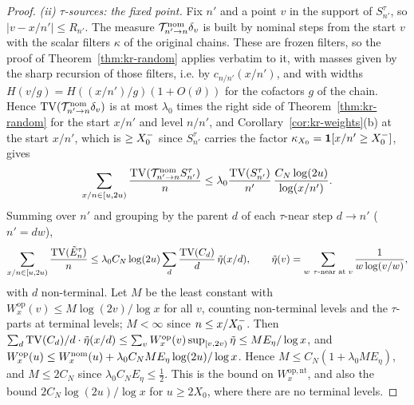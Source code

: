 \begin{proof}
\emph{(ii) $\tau$-sources: the fixed point.} Fix $n'$ and a point $v$ in the support of $S^\tau_{n'}$, so
$|v-x/n'|\le R_{n'}$. The measure $\mathcal T^{\mathrm{nom}}_{n'\to n}\delta_v$ is built by nominal steps from the start $v$ with the
scalar filters $\kappa$ of the original chains. These are frozen filters, so the proof of Theorem~\ref{thm:kr-random}
applies verbatim to it, with masses given by the sharp recursion of those filters, i.e. by $c_{n/n'}(x/n')$, and with widths
$H(v/g)=H((x/n')/g)(1+O(\vartheta))$ for the cofactors $g$ of the chain. Hence $\operatorname{TV}(\mathcal T^{\mathrm{nom}}_{n'\to n}\delta_v)$ is
at most $\lambda_0$ times the right side of Theorem~\ref{thm:kr-random} for the start $x/n'$ and level $n/n'$, and
Corollary~\ref{cor:kr-weights}(b) at the start $x/n'$, which is $\ge X_0^{-}$ since $S^\tau_{n'}$ carries the factor
$\kappa_{X_0}=\mathbf 1[x/n'\ge X_0^{-}]$, gives
\[
  \sum_{x/n\in[u,2u)}\frac{\operatorname{TV}(\mathcal T^{\mathrm{nom}}_{n'\to n}S^\tau_{n'})}{n}\le\lambda_0\frac{\operatorname{TV}(S^\tau_{n'})}{n'}\,
  \frac{C_N\log(2u)}{\log(x/n')}.
\]
Summing over $n'$ and grouping by the parent $d$ of each $\tau$-near step $d\to n'$ ($n'=dw$),
\[
  \sum_{x/n\in[u,2u)}\frac{\operatorname{TV}(\tilde E_n^\tau)}n\le\lambda_0C_N\log(2u)\sum_d\frac{\operatorname{TV}(C_d)}d\,\tilde\eta(x/d),\qquad
  \tilde\eta(v)=\sum_{w\ \tau\text{-near at }v}\frac1{w\log(v/w)},
\]
with $d$ non-terminal. Let $M$ be the least constant with $W^{\mathrm{op}}_x(v)\le M\log(2v)/\log x$ for all $v$, counting
non-terminal levels and the $\tau$-parts at terminal levels; $M<\infty$ since $n\le x/X_0^{-}$. Then
$\sum_d\operatorname{TV}(C_d)/d\cdot\tilde\eta(x/d)\le\sum_v W^{\mathrm{op}}_x(v)\sup_{[v,2v)}\tilde\eta\le ME_\eta/\log x$, and
$W^{\mathrm{op}}_x(u)\le W^{\mathrm{nom}}_x(u)+\lambda_0C_NME_\eta\log(2u)/\log x$. Hence $M\le C_N(1+\lambda_0ME_\eta)$, and
$M\le2C_N$ since $\lambda_0C_NE_\eta\le\frac12$. This is the bound on $W^{\mathrm{op,nt}}_x$, and also the bound
$2C_N\log(2u)/\log x$ for $u\ge2X_0$, where there are no terminal levels.


\end{proof}
